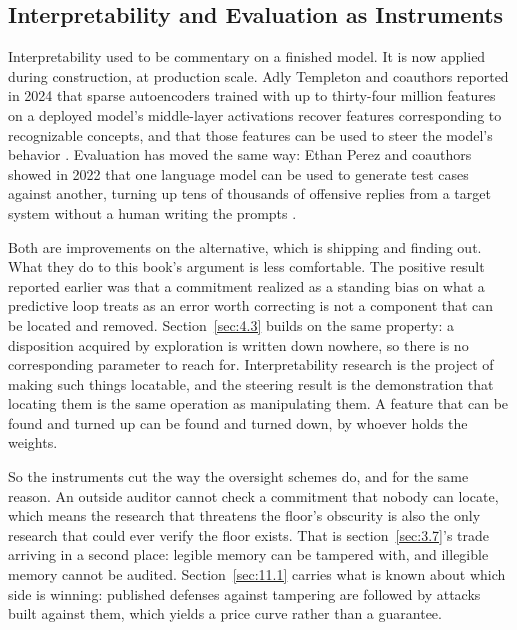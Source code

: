 \subsection{Interpretability and Evaluation as Instruments}
\label{sec:4.2.7}
Interpretability used to be commentary on a finished model. It is now applied during construction, at production scale. Adly Templeton and coauthors reported in 2024 that sparse autoencoders trained with up to thirty-four million features on a deployed model's middle-layer activations recover features corresponding to recognizable concepts, and that those features can be used to steer the model's behavior \autocite{templeton2024scaling}. Evaluation has moved the same way: Ethan Perez and coauthors showed in 2022 that one language model can be used to generate test cases against another, turning up tens of thousands of offensive replies from a target system without a human writing the prompts \autocite{perez2022red}.

Both are improvements on the alternative, which is shipping and finding out. What they do to this book's argument is less comfortable. The positive result reported earlier was that a commitment realized as a standing bias on what a predictive loop treats as an error worth correcting is not a component that can be located and removed. Section~\ref{sec:4.3} builds on the same property: a disposition acquired by exploration is written down nowhere, so there is no corresponding parameter to reach for. Interpretability research is the project of making such things locatable, and the steering result is the demonstration that locating them is the same operation as manipulating them. A feature that can be found and turned up can be found and turned down, by whoever holds the weights.

So the instruments cut the way the oversight schemes do, and for the same reason. An outside auditor cannot check a commitment that nobody can locate, which means the research that threatens the floor's obscurity is also the only research that could ever verify the floor exists. That is section~\ref{sec:3.7}'s trade arriving in a second place: legible memory can be tampered with, and illegible memory cannot be audited. Section~\ref{sec:11.1} carries what is known about which side is winning: published defenses against tampering are followed by attacks built against them, which yields a price curve rather than a guarantee.

